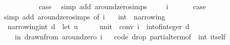 \begin{isabellebody}
\ \ \isamarkupfalse%
\ {}\isanewline
\ \ \isamarkupfalse%
\ {}\ \isamarkupfalse%
\ {\isacharquery}{\kern0pt}case\ \isamarkupfalse%
\ {\isacharparenleft}{\kern0pt}simp\ add{\isacharcolon}{\kern0pt}\ around{\isacharunderscore}{\kern0pt}zero{\isachardot}{\kern0pt}simps{\isacharparenright}{\kern0pt}\isanewline
{}\isamarkupfalse%
\isanewline
\ \ \isamarkupfalse%
\ {\isacharparenleft}{\kern0pt}{}\ i{\isacharparenright}{\kern0pt}\isanewline
\ \ \isamarkupfalse%
\ {}\ \isamarkupfalse%
\ {\isacharquery}{\kern0pt}case\isanewline
\ \ \ \ \isamarkupfalse%
\ {\isacharparenleft}{\kern0pt}simp\ add{\isacharcolon}{\kern0pt}\ around{\isacharunderscore}{\kern0pt}zero{\isachardot}{\kern0pt}simps\ {\isacharbrackleft}{\kern0pt}of\ {\isachardoublequoteopen}i\ {\isacharplus}{\kern0pt}\ {}{\isachardoublequoteclose}{\isacharbrackright}{\kern0pt}{\isacharparenright}{\kern0pt}\isanewline
{}\isamarkupfalse%
%
\endisatagproof
{\isafoldproof}%
%
\isadelimproof
\isanewline
%
\endisadelimproof
\isanewline
{}\isamarkupfalse%
\ int\ {\isacharcolon}{\kern0pt}{\isacharcolon}{\kern0pt}\ narrowing\isanewline
{}\isanewline
\isanewline
{}\isamarkupfalse%
\isanewline
\ \ {\isachardoublequoteopen}narrowing{\isacharunderscore}{\kern0pt}int\ d\ {\isacharequal}{\kern0pt}\ {\isacharparenleft}{\kern0pt}let\ {\isacharparenleft}{\kern0pt}u\ {\isacharcolon}{\kern0pt}{\isacharcolon}{\kern0pt}\ {\isacharunderscore}{\kern0pt}\ {\isasymRightarrow}\ {\isacharunderscore}{\kern0pt}\ {\isasymRightarrow}\ unit{\isacharparenright}{\kern0pt}\ {\isacharequal}{\kern0pt}\ conv{\isacharsemicolon}{\kern0pt}\ i\ {\isacharequal}{\kern0pt}\ int{\isacharunderscore}{\kern0pt}of{\isacharunderscore}{\kern0pt}integer\ d\isanewline
\ \ \ \ in\ drawn{\isacharunderscore}{\kern0pt}from\ {\isacharparenleft}{\kern0pt}around{\isacharunderscore}{\kern0pt}zero\ i{\isacharparenright}{\kern0pt}{\isacharparenright}{\kern0pt}{\isachardoublequoteclose}\isanewline
\isanewline
{}\isamarkupfalse%
%
\isadelimproof
\ %
\endisadelimproof
%
\isatagproof
\isacommand{{\isachardot}{\kern0pt}{\isachardot}{\kern0pt}}\isamarkupfalse%
%
\endisatagproof
{\isafoldproof}%
%
\isadelimproof
%
\endisadelimproof
\isanewline
\isanewline
{}\isamarkupfalse%
\isanewline
\isanewline
{}\isamarkupfalse%
\ {\isacharbrackleft}{\kern0pt}{\isacharbrackleft}{\kern0pt}code\ drop{\isacharcolon}{\kern0pt}\ {\isachardoublequoteopen}partial{\isacharunderscore}{\kern0pt}term{\isacharunderscore}{\kern0pt}of\ {\isacharcolon}{\kern0pt}{\isacharcolon}{\kern0pt}\ int\ itself\ {\isasymRightarrow}\ {\isacharunderscore}{\kern0pt}{\isachardoublequoteclose}{\isacharbrackright}{\kern0pt}{\isacharbrackright}{\kern0pt}\isanewline

\end{isabellebody}
